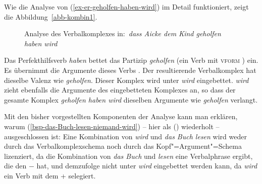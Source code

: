 Wie die Analyse von (\ref{ex-er-geholfen-haben-wird}) im Detail funktioniert, zeigt die Abbildung~\vref{abb-kombin1}.
\begin{figure}
\caption{Analyse des Verbalkomplexes in:\ \emph{dass Aicke dem Kind geholfen haben wird}}\label{abb-kombin1}%
\end{figure}
Das Perfekthilfsverb \emph{haben} bettet das Partizip \emph{geholfen} (ein Verb mit \textsc{vform} )
ein. Es übernimmt die Argumente dieses Verbs . Der resultierende Verbalkomplex hat dieselbe
Valenz wie \emph{geholfen}. Dieser Komplex wird unter \emph{wird} eingebettet. \emph{wird} zieht
ebenfalls die Argumente des eingebetteten Komplexes an, so dass der gesamte Komplex \emph{geholfen haben wird}
dieselben Argumente wie \emph{geholfen} verlangt.

Mit den bisher vorgestellten Komponenten der Analyse kann man erklären, warum
(\ref{bsp-das-Buch-lesen-niemand-wird}) -- hier als () wiederholt --
ausgeschlossen ist:
\z
Eine Kombination von \emph{wird} und \emph{das Buch lesen} wird weder durch das Verbalkomplexschema
noch durch das Kopf"=Argument"=Schema lizenziert, da die Kombination von \emph{das Buch} und \emph{lesen} 
eine Verbalphrase ergibt, die den \lexw $-$ hat, 
und demzufolge nicht unter \emph{wird} eingebettet werden kann, da \emph{wird} ein Verb mit
dem \lexw + selegiert.

